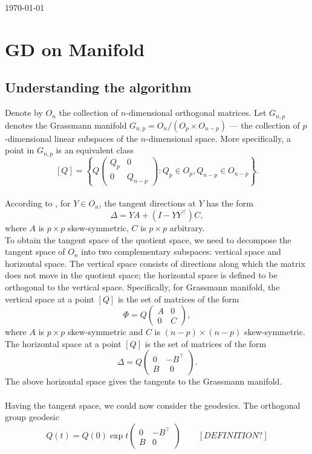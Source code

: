 \documentclass[12pt]{article}%
\begin{document}
\noindent\today

\section{GD on Manifold}
\subsection{Understanding the algorithm}
\noindent
Denote by $O_n$ the collection of $n$-dimensional orthogonal matrices.
Let $G_{n, p}$ denotes the Grassmann manifold 
$G_{n, p}=O_{n} /\left(O_{p} \times O_{n-p}\right)$
--- the collection of $p$-dimensional linear subspaces of the $n$-dimensional space. More specifically, a point in $G_{n, p}$ is an equivalent class 
$$
[Q]=\left\{Q\left(\begin{array}{cc}{Q_{p}} & {0} \\ {0} & {Q_{n-p}}\end{array}\right) : Q_{p} \in O_{p}, Q_{n-p} \in O_{n-p}\right\}.
$$
\\
According to \cite{Edelman1998}, for $Y\in O_n$, the tangent directions at $Y$ has the form
$$
\Delta = YA+(I-YY^\top)C,
$$ 
where $A$ is $p\times p$ skew-symmetric, $C$ is $p\times p$ arbitrary.\\
To obtain the tangent space of the quotient space, we need to decompose the tangent space of $O_n$ into two complementary subspaces: vertical space and horizontal space. 
The vertical space consists of directions along which the matrix does not move in the quotient space; the horizontal space is defined to be orthogonal to the vertical space. Specifically, for Grassmann manifold, the vertical space at a point $[Q]$ is the set of matrices of the form
$$
\Phi=Q\left(\begin{array}{cc}{A} & {0} \\ {0} & {C}\end{array}\right),
$$
where $A$ is $p\times p$ skew-symmetric and $C$ is $(n-p)\times (n-p)$ skew-symmetric. The horizontal space at a point $[Q]$ is the set of matrices of the form
$$
\Delta=Q\left(\begin{array}{ll}{0} & {-B^{\top}} \\ {B} & {\ \ 0}\end{array}\right).
$$
The above horizontal space gives the tangents to the Grassmann manifold.\\
\\
Having the tangent space, we could now consider the geodesics. The orthogonal group geodesic
$$
Q(t)=Q(0) \exp t\left(\begin{array}{cc}{0} & {-B^{\top}} \\ {B} & {0}\end{array}\right)\qquad [DEFINITION?]
$$
\end{document}
